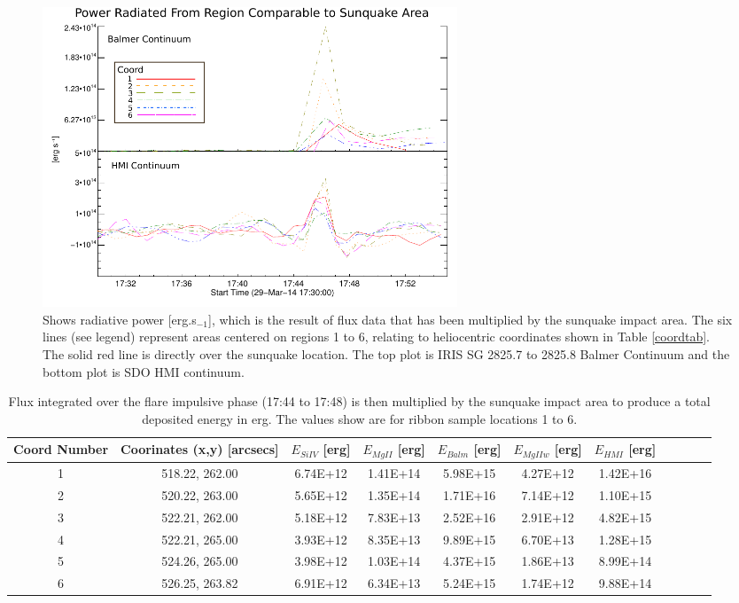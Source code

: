 \documentclass[11pt]{article}
\begin{document}
\begin{figure}[H]
  \begin{center}
  \includegraphics[width=0.6\textwidth]{29-Mar-14-A_sqk-Power-Ladder-Balm-HMI-Only}
  \end{center}
  \caption{Shows radiative power [erg.s$_{-1}$], which is the result of flux data that has been multiplied by the sunquake impact area. The six lines (see legend) represent areas centered on regions 1 to 6, relating to heliocentric coordinates shown in Table \ref{coordtab}. The solid red line is directly over the sunquake location. The top plot is IRIS SG  2825.7 to 2825.8 Balmer Continuum and the bottom plot is SDO HMI continuum.}\label{powerladder-balm-hmi-only}
\end{figure}




\begin{table}[h]
\centering
\begin{tabular}{|c|c|c|c|c|c|c|c|c|c|c|}
Coord Number & Coorinates (x,y) [arcsecs] & $E_{Si IV}$ [erg] & $E_{Mg II}$ [erg] & $E_{Balm}$ [erg] & $E_{Mg II w}$ [erg] & $E_{HMI}$ [erg]\\
\hline
1 & 518.22, 262.00 & 6.74E+12 & 1.41E+14 & 5.98E+15 & 4.27E+12 & 1.42E+16\\
2 & 520.22, 263.00 & 5.65E+12 & 1.35E+14 & 1.71E+16 & 7.14E+12 & 1.10E+15\\
3 & 522.21, 262.00 & 5.18E+12 & 7.83E+13 & 2.52E+16 & 2.91E+12 & 4.82E+15\\
4 & 522.21, 265.00 & 3.93E+12 & 8.35E+13 & 9.89E+15 & 6.70E+13 & 1.28E+15\\
5 & 524.26, 265.00 & 3.98E+12 & 1.03E+14 & 4.37E+15 & 1.86E+13 & 8.99E+14\\
6 & 526.25, 263.82 & 6.91E+12 & 6.34E+13 & 5.24E+15 & 1.74E+12 & 9.88E+14\\
\end{tabular}
\caption{Flux integrated over the flare impulsive phase (17:44 to 17:48) is then multiplied by the sunquake impact area to produce a total deposited energy in erg. The values show are for ribbon sample locations 1 to 6.}\label{eimp}
\end{table}







\label{Bibliography}
%
\end{document}
